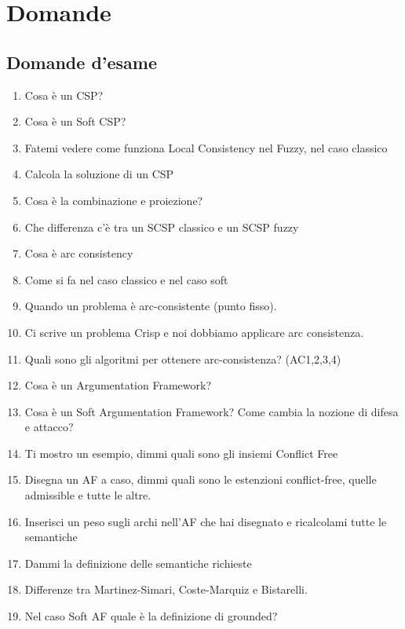 \chapter{Domande} \label{Domande}
\section{Domande d'esame}
\begin{enumerate}
    \item Cosa è un CSP?
    \item Cosa è un Soft CSP?
    \item Fatemi vedere come funziona Local Consistency nel Fuzzy, nel caso classico
    \item Calcola la soluzione di un CSP
    \item Cosa è la combinazione e proiezione?
    \item Che differenza c’è tra un SCSP classico e un SCSP fuzzy
    \item Cosa è arc consistency
    \item Come si fa nel caso classico e nel caso soft
    \item Quando un problema è arc-consistente (punto fisso).
    \item Ci scrive un problema Crisp e noi dobbiamo applicare arc consistenza.
    \item Quali sono gli algoritmi per ottenere arc-consistenza? (AC1,2,3,4)
    \item Cosa è un Argumentation Framework?
    \item Cosa è un Soft Argumentation Framework? Come cambia la nozione di difesa e attacco?
    \item Ti mostro un esempio, dimmi quali sono gli insiemi Conflict Free
    \item Disegna un AF a caso, dimmi quali sono le estenzioni conflict-free, quelle admissible e tutte le altre.
    \item Inserisci un peso sugli archi nell’AF che hai disegnato e ricalcolami tutte le semantiche
    \item Dammi la definizione delle semantiche richieste
    \item Differenze tra Martinez-Simari, Coste-Marquiz e Bistarelli.
    \item Nel caso Soft AF quale è la definizione di grounded?
\end{enumerate}   
    


